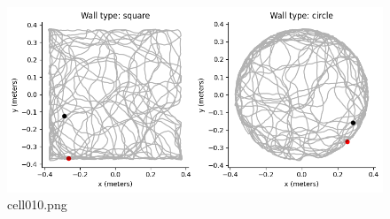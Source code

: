 \begin{figure}[ht]
	\centering
	\includegraphics[scale=0.8, max width=\linewidth]{./fig/motor-learning/rat-trajectory/cell010.png}
	\caption{cell010.png}
	\label{cell010.png}
\end{figure}